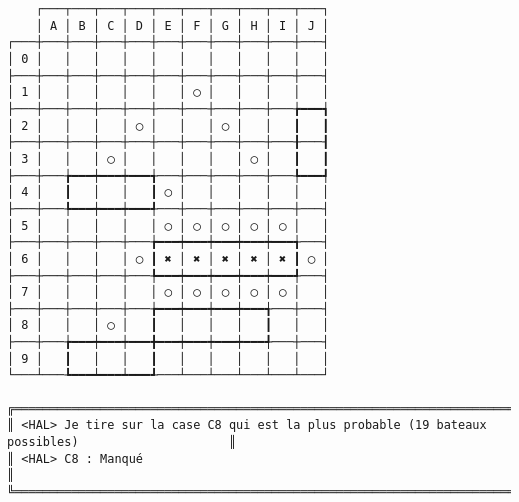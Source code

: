 {\scriptsize
\begin{verbatim}
    ┌───┬───┬───┬───┬───┬───┬───┬───┬───┬───┐
    │ A │ B │ C │ D │ E │ F │ G │ H │ I │ J │
┌───┼───┼───┼───┼───┼───┼───┼───┼───┼───┼───┤
│ 0 │   │   │   │   │   │   │   │   │   │   │
├───┼───┼───┼───┼───┼───┼───┼───┼───┼───┼───┤
│ 1 │   │   │   │   │   │ ◯ │   │   │   │   │
├───┼───┼───┼───┼───┼───┼───┼───┼───┼───╆━━━┪
│ 2 │   │   │   │ ◯ │   │   │ ◯ │   │   ┃   ┃
├───┼───┼───┼───┼───┼───┼───┼───┼───┼───╂───┨
│ 3 │   │   │ ◯ │   │   │   │   │ ◯ │   ┃   ┃
├───┼───╆━━━┿━━━┿━━━╅───┼───┼───┼───┼───╄━━━┩
│ 4 │   ┃   │   │   ┃ ◯ │   │   │   │   │   │
├───┼───╄━━━┿━━━┿━━━╃───┼───┼───┼───┼───┼───┤
│ 5 │   │   │   │   │ ◯ │ ◯ │ ◯ │ ◯ │ ◯ │   │
├───┼───┼───┼───┼───╆━━━┿━━━┿━━━┿━━━┿━━━╅───┤
│ 6 │   │   │   │ ◯ ┃ ✖ │ ✖ │ ✖ │ ✖ │ ✖ ┃ ◯ │
├───┼───┼───┼───┼───╄━━━┿━━━┿━━━┿━━━┿━━━╃───┤
│ 7 │   │   │   │   │ ◯ │ ◯ │ ◯ │ ◯ │ ◯ │   │
├───┼───┼───┼───┼───╆━━━┿━━━┿━━━┿━━━╅───┼───┤
│ 8 │   │   │ ◯ │   ┃   │   │   │   ┃   │   │
├───┼───╆━━━┿━━━┿━━━╋━━━┿━━━┿━━━┿━━━╃───┼───┤
│ 9 │   ┃   │   │   ┃   │   │   │   │   │   │
└───┴───┺━━━┷━━━┷━━━┹───┴───┴───┴───┴───┴───┘

╔══════════════════════════════════════════════════════════════════════════════════════════════════╗
║ <HAL> Je tire sur la case C8 qui est la plus probable (19 bateaux possibles)                     ║
║ <HAL> C8 : Manqué                                                                                ║
╚══════════════════════════════════════════════════════════════════════════════════════════════════╝
\end{verbatim}}
\newpage

